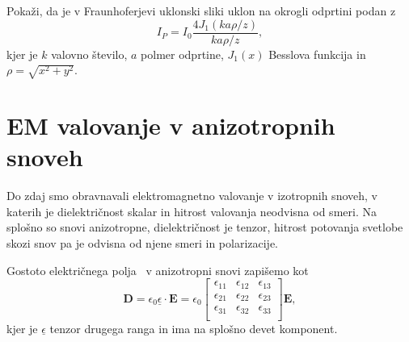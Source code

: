 \begin{definition}
\label{naloga-Frauhofer-Kirchhoff-uklon}
Pokaži, da je v Fraunhoferjevi uklonski sliki uklon na okrogli odprtini podan z
\begin{equation}
I_P = I_0\frac{4 J_1(k a \rho/ z)}{k a \rho/z},
\end{equation}
kjer je $k$ valovno število, $a$ polmer odprtine, $J_1(x)$ Besslova funkcija in $\rho = \sqrt{x^2+y^2}$.
\end{definition}

\section{EM valovanje v anizotropnih snoveh}\label{chap:anizotropni}
Do zdaj smo obravnavali elektromagnetno valovanje
v izotropnih snoveh, v katerih je di\-elek\-tri\-čnost skalar in hitrost 
valovanja neodvisna od smeri. Na splošno so snovi anizotropne,
dielektričnost je tenzor, hitrost potovanja svetlobe 
skozi snov pa je odvisna od njene smeri in polarizacije.

Gostoto električnega polja~ v anizotropni snovi zapišemo kot 
\begin{equation}
\mathbf{D}=\epsilon_{0}\underline{\epsilon} \cdot\mathbf{E} = 
\epsilon_{0}
\left[\begin{array}{ccc}
\epsilon_{11} & \epsilon_{12}& \epsilon_{13}\\
\epsilon_{21} & \epsilon_{22}& \epsilon_{23}\\
\epsilon_{31} & \epsilon_{32}& \epsilon_{33}\\
\end{array}\right]\mathbf{E},
\label{eq:gostota-elektricnega-polja-tenzor}
\end{equation}
kjer je $\underline{\epsilon}$ tenzor drugega ranga in ima na splošno devet komponent.


